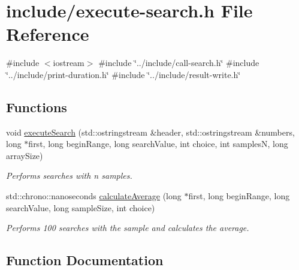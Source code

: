 \hypertarget{execute-search_8h}{}\section{include/execute-\/search.h File Reference}
\label{execute-search_8h}
{\ttfamily \#include $<$iostream$>$}\newline
{\ttfamily \#include \char`\"{}../include/call-\/search.\+h\char`\"{}}\newline
{\ttfamily \#include \char`\"{}../include/print-\/duration.\+h\char`\"{}}\newline
{\ttfamily \#include \char`\"{}../include/result-\/write.\+h\char`\"{}}\newline
\subsection*{Functions}
\begin{DoxyCompactItemize}
\item 
void \mbox{\hyperlink{execute-search_8h_add6898191acaf3cbf729012cc3b95afa}{execute\+Search}} (std\+::ostringstream \&header, std\+::ostringstream \&numbers, long $\ast$first, long begin\+Range, long search\+Value, int choice, int samplesN, long array\+Size)
\begin{DoxyCompactList}\small\item\em Performs searches with n samples. \end{DoxyCompactList}\item 
std\+::chrono\+::nanoseconds \mbox{\hyperlink{execute-search_8h_a42e66a1ddcf8869c50fde7c7f7599a77}{calculate\+Average}} (long $\ast$first, long begin\+Range, long search\+Value, long sample\+Size, int choice)
\begin{DoxyCompactList}\small\item\em Performs 100 searches with the sample and calculates the average. \end{DoxyCompactList}\end{DoxyCompactItemize}


\subsection{Function Documentation}
\mbox{\label{execute-search_8h_a42e66a1ddcf8869c50fde7c7f7599a77}} 
